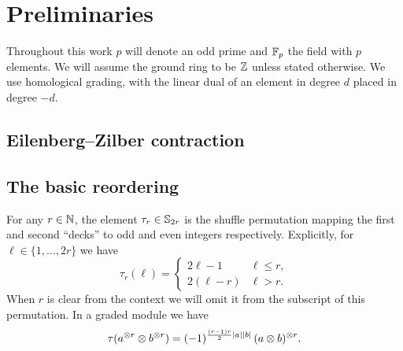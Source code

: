 
\section{Preliminaries}

Throughout this work $p$ will denote an odd prime and ${\mathbb{F}_p}$ the field with $p$ elements.
We will assume the ground ring to be $\mathbb{Z}$ unless stated otherwise.
We use homological grading, with the linear dual of an element in degree $d$ placed in degree $-d$.

\subsection{Eilenberg--Zilber contraction}

\TBW{}

\subsection{The basic reordering}\label{ss:reordering}

For any $r\in\mathbb{N}$, the element $\tau_r \in \mathbb{S}_{2r}$ is the shuffle permutation mapping the first and second ``decks'' to odd and even integers respectively.
Explicitly, for $\ell \in \{1,\dots,2r\}$ we have
\begin{equation*}
	\tau_r(\ell) =
	\begin{cases}
		2\ell-1 & \ell \leq r, \\
		2(\ell-r) & \ell > r.
	\end{cases}
\end{equation*}
When $r$ is clear from the context we will omit it from the subscript of this permutation.
In a graded module we have
\[
\tau(a^{\otimes r} \otimes b^{\otimes r}) =
(-1)^{\frac{(r-1)r}{2}\lvert a\rvert\lvert b\rvert} \, (a \otimes b)^{\otimes r}.
\]